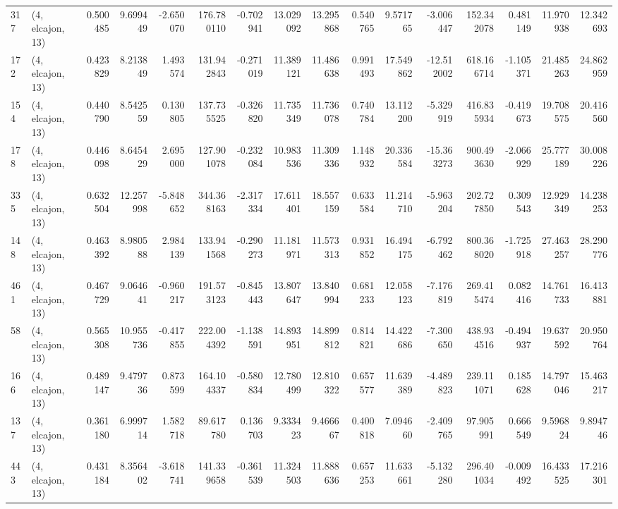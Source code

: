 \begin{tabular}{llrrrrrrrrrrrrrr}
317 &  (4, elcajon, 13) &   0.500485 &   9.699449 &  -2.650070 &   176.780110 &  -0.702941 &  13.029092 &  13.295868 &  0.540765 &   9.571765 &  -3.006447 &   152.342078 &  0.481149 &  11.970938 &  12.342693 \\
172 &  (4, elcajon, 13) &   0.423829 &   8.213849 &   1.493574 &   131.942843 &  -0.271019 &  11.389121 &  11.486638 &  0.991493 &  17.549862 & -12.512002 &   618.166714 & -1.105371 &  21.485263 &  24.862959 \\
154 &  (4, elcajon, 13) &   0.440790 &   8.542559 &   0.130805 &   137.735525 &  -0.326820 &  11.735349 &  11.736078 &  0.740784 &  13.112200 &  -5.329919 &   416.835934 & -0.419673 &  19.708575 &  20.416560 \\
178 &  (4, elcajon, 13) &   0.446098 &   8.645429 &   2.695000 &   127.901078 &  -0.232084 &  10.983536 &  11.309336 &  1.148932 &  20.336584 & -15.363273 &   900.493630 & -2.066929 &  25.777189 &  30.008226 \\
335 &  (4, elcajon, 13) &   0.632504 &  12.257998 &  -5.848652 &   344.368163 &  -2.317334 &  17.611401 &  18.557159 &  0.633584 &  11.214710 &  -5.963204 &   202.727850 &  0.309543 &  12.929349 &  14.238253 \\
148 &  (4, elcajon, 13) &   0.463392 &   8.980588 &   2.984139 &   133.941568 &  -0.290273 &  11.181971 &  11.573313 &  0.931852 &  16.494175 &  -6.792462 &   800.368020 & -1.725918 &  27.463257 &  28.290776 \\
461 &  (4, elcajon, 13) &   0.467729 &   9.064641 &  -0.960217 &   191.573123 &  -0.845443 &  13.807647 &  13.840994 &  0.681233 &  12.058123 &  -7.176819 &   269.415474 &  0.082416 &  14.761733 &  16.413881 \\
58  &  (4, elcajon, 13) &   0.565308 &  10.955736 &  -0.417855 &   222.004392 &  -1.138591 &  14.893951 &  14.899812 &  0.814821 &  14.422686 &  -7.300650 &   438.934516 & -0.494937 &  19.637592 &  20.950764 \\
166 &  (4, elcajon, 13) &   0.489147 &   9.479736 &   0.873599 &   164.104337 &  -0.580834 &  12.780499 &  12.810322 &  0.657577 &  11.639389 &  -4.489823 &   239.111071 &  0.185628 &  14.797046 &  15.463217 \\
137 &  (4, elcajon, 13) &   0.361180 &   6.999714 &   1.582718 &    89.617780 &   0.136703 &   9.333423 &   9.466667 &  0.400818 &   7.094660 &  -2.409765 &    97.905991 &  0.666549 &   9.596824 &   9.894746 \\
443 &  (4, elcajon, 13) &   0.431184 &   8.356402 &  -3.618741 &   141.339658 &  -0.361539 &  11.324503 &  11.888636 &  0.657253 &  11.633661 &  -5.132280 &   296.401034 & -0.009492 &  16.433525 &  17.216301 \\

\end{tabular}
